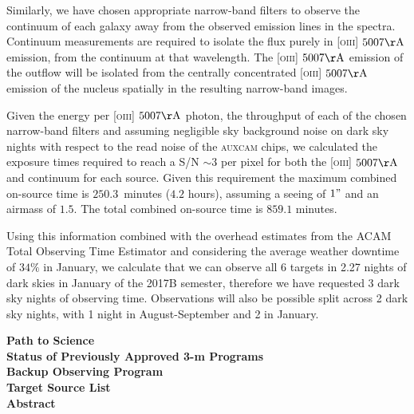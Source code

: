\documentclass[12pt]{article}
\begin{document}
Similarly, we have chosen appropriate narrow-band filters to observe the continuum of each galaxy away from the observed emission lines in the spectra. Continuum measurements are required to isolate the flux purely in \textsc{[oiii]} $5007\rm{\AA}$ emission, from the continuum at that wavelength. The \textsc{[oiii]} $5007\rm{\AA}$ emission of the outflow will be isolated from the centrally concentrated \textsc{[oiii]} $5007\rm{\AA}$ emission of the nucleus spatially in the resulting narrow-band images. 
\vspace{0.25em}

Given the energy per \textsc{[oiii]} $5007\rm{\AA}$ photon, the throughput of each of the chosen narrow-band filters and assuming negligible sky background noise on dark sky nights  with respect to the read noise of the \textsc{auxcam} chips, we calculated the exposure times required to reach a S/N $\sim 3$ per pixel for both the \textsc{[oiii]} $5007\rm{\AA}$ and continuum for each source. Given this requirement the maximum combined on-source time is $250.3$~minutes ($4.2$ hours), assuming a seeing of $1"$ and an airmass of $1.5$. The total combined on-source time is $859.1$ minutes.  
\vspace{0.25em}

Using this information combined with the overhead estimates from the ACAM Total Observing Time Estimator and considering the average weather downtime of $34\%$ in January, we calculate that we can observe all 6 targets in 2.27 nights of dark skies in January of the 2017B semester, therefore we have requested 3 dark sky nights of observing time. Observations will also be possible split across 2 dark sky nights, with 1 night in August-September and 2 in January.

{\bf Path to Science}
\\

{\bf Status of Previously Approved 3-m Programs}
\\

{\bf Backup Observing Program}
\\

{\bf Target Source List}
\\

{\bf Abstract}
\end{document}
